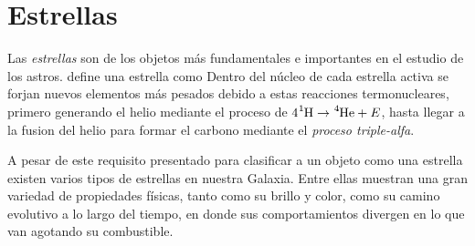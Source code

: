 \section{Estrellas}

Las \textit{estrellas} son de los objetos más fundamentales e importantes en el
estudio de los astros. \citet*{anIntroStellarAstro::chapter1_basicConcepts}
define una estrella como  Dentro del núcleo de cada estrella activa se forjan nuevos elementos
más pesados debido a estas reacciones termonucleares, primero generando el helio
mediante el proceso de $4 \ce{^1H} \rightarrow \ce{^4He} + E$, hasta llegar a la
fusion del helio para formar el carbono mediante el \textit{proceso
triple-alfa}.

A pesar de este requisito presentado para clasificar a un objeto como una
estrella existen varios tipos de estrellas en nuestra Galaxia. Entre ellas
muestran una gran variedad de propiedades físicas, tanto como su brillo y color,
como su camino evolutivo a lo largo del tiempo, en donde sus comportamientos
divergen en lo que van agotando su combustible.

